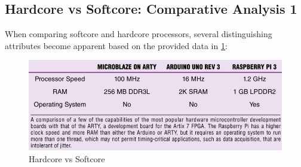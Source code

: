 \documentclass[conference]{IEEEtran}
\begin{document}
\subsection{\textbf{Hardcore vs Softcore: Comparative Analysis 1}}

When comparing softcore and hardcore processors, several distinguishing attributes become apparent based on the provided data in \ref{fig3}:

\begin{figure}[ht]
\begin{center}
  \includegraphics[scale=0.35]{romeo.t1-2733341-large (1).png}
\end{center}
  \caption{Hardcore vs Softcore \cite{3}}
  \label{fig3}
\end{figure}
\end{document}
